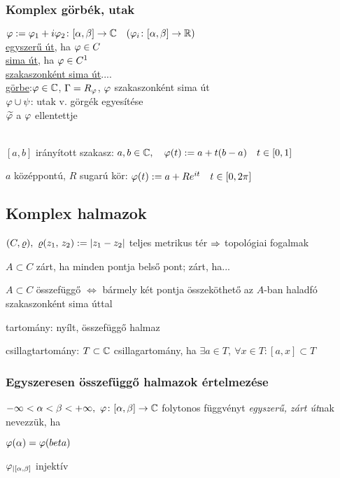\subsubsection{Komplex görbék, utak}
$\varphi:=\varphi_1 + i\varphi_2\colon [\alpha,\beta]\to \mathbb{C}\quad(\varphi_i\colon[\alpha,\beta]\to\mathbb{R})$\\
\underline{egyszerű út}, ha $\varphi\in C$\\
\underline{sima út}, ha $\varphi\in C^1$\\
\underline{szakaszonként sima út}....\\
\underline{görbe}:$\varphi\in\mathbb{C}$, $\Gamma=R_\varphi$, $\varphi$ szakaszonként sima út\\
$\varphi \cup \psi$: utak v. görgék egyesítése\\
$\widetilde{\varphi}$ a $\varphi$ ellentettje\\\\

\begin{Pl}
\item $[a, b]$ irányított szakasz: $a,b\in \mathbb{C},\quad \varphi(t) := a + t(b-a)\quad t\in[0,1]$
\item $a$ középpontú, $R$ sugarú kör: $\varphi(t) := a + Re^{it}\quad t\in[0,2\pi]$
\end{Pl}

\subsection{Komplex halmazok}
$(C, \varrho),\ \varrho(z_1,\,z_2) := | z_1 - z_2 |$ teljes metrikus tér $\Rightarrow$ topológiai fogalmak
\begin{enumzjb}
  \item $A\subset C$ zárt, ha minden pontja belső pont; zárt, ha...
  \item $A\subset C$ összefüggő $\iff$ bármely két pontja összeköthető az $A$-ban haladfó szakaszonként sima úttal
  \item tartomány: nyílt, összefüggő halmaz
  \item csillagtartomány: $T\subset \mathbb{C}$ csillagartomány, ha $\exists a\in T,\ \forall x\in T\colon [a,x]\subset T$
\end{enumzjb}

\subsubsection{Egyszeresen összefüggő halmazok értelmezése}
\begin{de} $-\infty<\alpha < \beta < +\infty,\ \varphi\colon [\alpha,\beta] \to \mathbb{C}$ folytonos függvényt \emph{egyszerű,
    zárt út}nak nevezzük, ha
  \begin{enumzjr}
    \item $\varphi(\alpha) = \varphi(beta)$
    \item $\varphi_{|[\alpha,\beta]}$ injektív
    \end{enumzjr}
\end{de}

